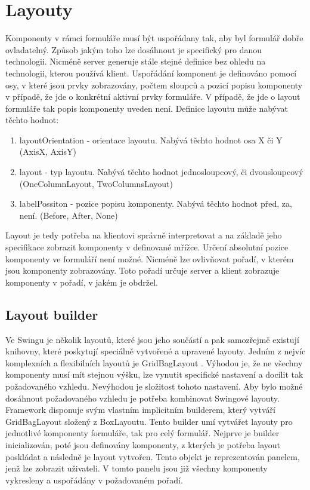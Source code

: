 \section{Layouty}
Komponenty v rámci formuláře musí být uspořádany tak, aby byl formulář dobře ovladatelný. Způsob jakým toho lze dosáhnout je specifický pro danou technologii. Nicméně server generuje stále stejné definice bez ohledu na technologii, kterou používá klient. Uspořádání komponent je definováno pomocí osy, v které jsou prvky zobrazovány, počtem sloupců a pozicí popisu komponenty v případě, že jde o konkrétní aktivní prvky formuláře. V případě, že jde o layout formuláře tak popis komponenty uveden není. Definice layoutu může nabývat těchto hodnot:
\begin{enumerate}
\item layoutOrientation - orientace layoutu. Nabývá těchto hodnot osa X či Y (AxisX, AxisY)
\item layout - typ layoutu. Nabývá těchto hodnot jednosloupcový, či dvousloupcový (OneColumnLayout, TwoColumnsLayout)
\item labelPossiton - pozice popisu komponenty. Nabývá těchto hodnot před, za, není. (Before, After, None)
\end{enumerate}
Layout je tedy potřeba na klientovi správně interpretovat a na základě jeho specifikace zobrazit komponenty v definované mřížce. Určení absolutní pozice komponenty ve formuláří není možné. Nicméně lze ovlivňovat pořadí, v kterém jsou komponenty zobrazovány. Toto pořadí určuje server a klient zobrazuje komponenty v pořadí, v jakém je obdržel. 
\subsection{Layout builder}
Ve Swingu je několik layoutů, které jsou jeho součástí a pak samozřejmě existují knihovny, které poskytují speciálně vytvořené a upravené layouty. Jedním z nejvíc komplexních a flexibilních layoutů je GridBagLayout \cite{gridBagLayout}. Výhodou je, že ne všechny komponenty musí mít stejnou výšku, lze vynutit specifické nastavení a docílit tak požadovaného vzhledu. Nevýhodou je složitost tohoto nastavení. Aby bylo možné dosáhnout požadovaného vzhledu je potřeba kombinovat Swingové layouty. Framework disponuje svým vlastním implicitním builderem, který vytváří GridBagLayout složený z BoxLayoutu. Tento builder umí vytvářet layouty pro jednotlivé komponenty formuláře, tak pro celý formulář. Nejprve je builder inicializován, poté jsou definovány komponenty, z kterých je potřeba layout poskládat a následně je layout vytvořen. Tento objekt je reprezentován panelem, jenž lze zobrazit uživateli. V tomto panelu jsou již všechny komponenty vykresleny a uspořádány v požadovaném pořadí. 

